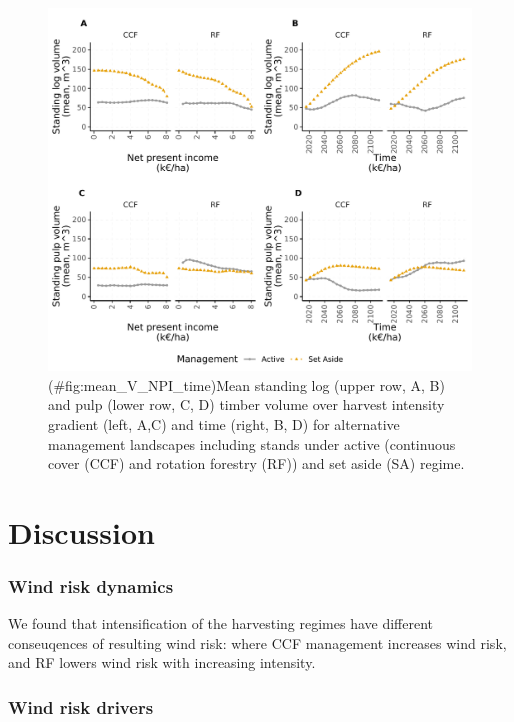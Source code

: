 \documentclass[]{elsarticle} %
\makeatletter
\def\maxwidth{\ifdim\Gin@nat@width>\linewidth\linewidth
\else\Gin@nat@width\fi}
\let\Oldincludegraphics\includegraphics
\renewcommand{\includegraphics}[1]{\Oldincludegraphics[width=\maxwidth]{#1}}
\makeatother
\begin{document}
\begin{figure}
\centering
\includegraphics{test_manus4_puhti_files/figure-latex/mean_V_NPI_time-1.pdf}
\caption{(\#fig:mean\_V\_NPI\_time)Mean standing log (upper row, A, B) and pulp (lower row, C, D) timber volume over harvest intensity gradient (left, A,C) and time (right, B, D) for alternative management landscapes including stands under active (continuous cover (CCF) and rotation forestry (RF)) and set aside (SA) regime.}
\end{figure}

\hypertarget{discussion}{%
\section{Discussion}\label{discussion}}

\hypertarget{wind-risk-dynamics}{%
\subsubsection{Wind risk dynamics}\label{wind-risk-dynamics}}

We found that intensification of the harvesting regimes have different conseuqences of resulting wind risk: where CCF management increases wind risk, and RF lowers wind risk with increasing intensity.

\hypertarget{wind-risk-drivers}{%
\subsubsection{Wind risk drivers}\label{wind-risk-drivers}}
\end{document}

